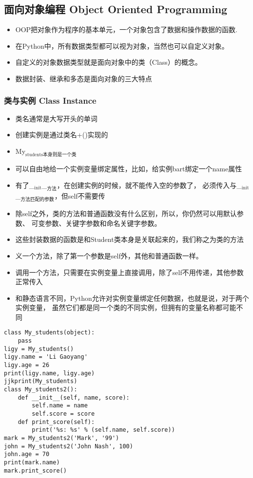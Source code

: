 \documentclass[11pt]{article}
\begin{document}
\subsection{面向对象编程 Object Oriented Programming}
\label{sec:orgf4ddb0b}
\begin{itemize}
\item OOP把对象作为程序的基本单元，一个对象包含了数据和操作数据的函数.
\item 在Python中，所有数据类型都可以视为对象，当然也可以自定义对象。
\item 自定义的对象数据类型就是面向对象中的类（Class）的概念。
\item 数据封装、继承和多态是面向对象的三大特点
\end{itemize}
\subsubsection{类与实例 Class Instance}
\label{sec:orgbcf8e71}
\begin{itemize}
\item 类名通常是大写开头的单词
\item 创建实例是通过类名+()实现的
\item My\(_{\text{students本身则是一个类}}\)
\item 可以自由地给一个实例变量绑定属性，比如，给实例bart绑定一个name属性
\item 有了\_\(_{\text{init}}\)\_\(_{\text{方法}}\)，在创建实例的时候，就不能传入空的参数了，
必须传入与\_\(_{\text{init}}\)\_\(_{\text{方法匹配的参数}}\)，但self不需要传
\item 除self之外，类的方法和普通函数没有什么区别，所以，你仍然可以用默认参数、
可变参数、关键字参数和命名关键字参数。
\item 这些封装数据的函数是和Student类本身是关联起来的，我们称之为类的方法
\item 义一个方法，除了第一个参数是self外，其他和普通函数一样。
\item 调用一个方法，只需要在实例变量上直接调用，除了self不用传递，其他参数正常传入
\end{itemize}

\begin{itemize}
\item 和静态语言不同，Python允许对实例变量绑定任何数据，也就是说，对于两个实例变量，
虽然它们都是同一个类的不同实例，但拥有的变量名称都可能不同
\end{itemize}

\begin{verbatim}
class My_students(object):
    pass
ligy = My_students()
ligy.name = 'Li Gaoyang'
ligy.age = 26
print(ligy.name, ligy.age)
jjkprint(My_students)
class My_students2():
    def __init__(self, name, score):
        self.name = name
        self.score = score
    def print_score(self):
        print('%s: %s' % (self.name, self.score))
mark = My_students2('Mark', '99')
john = My_students2('John Nash', 100)
john.age = 70
print(mark.name)
mark.print_score()
\end{verbatim}
\end{document}
